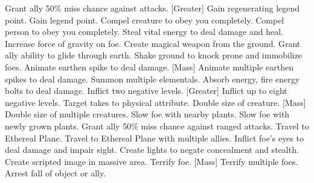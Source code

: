     {Grant ally 50\% miss chance against attacks.}
[Greater]
    {Gain regenerating legend point.}
    {Gain legend point.}
    {Compel creature to obey you completely.}
    {Compel person to obey you completely.}
    {Steal vital energy to deal damage and heal.}
    {Increase force of gravity on foe.}
    {Create magical weapon from the ground.}
    {Grant ally ability to glide through earth.}
    {Shake ground to knock prone and immobilize foes.}
    {Animate earthen spike to deal damage.}
[Mass]
    {Animate multiple earthen spikes to deal damage.}
    {Summon multiple elementals.}
    {Absorb energy, fire energy bolts to deal damage.}
    {Inflict two negative levels.}
[Greater]
    {Inflict up to eight negative levels.}
    {Target takes  to physical attribute.}
    {Double size of creature.}
[Mass]
    {Double size of multiple creatures.}
    {Slow foe with nearby plants.}
    {Slow foe with newly grown plants.}
    {Grant ally 50\% miss chance against ranged attacks.}
    {Travel to Ethereal Plane.}
    {Travel to Ethereal Plane with multiple allies.}
    {Inflict foe's eyes to deal damage and impair sight.}
    {Create lights to negate concealment and stealth.}
    {Create scripted image in massive area.}
    {Terrify foe.}
[Mass]
    {Terrify multiple foes.}
    {Arrest fall of object or ally.}
